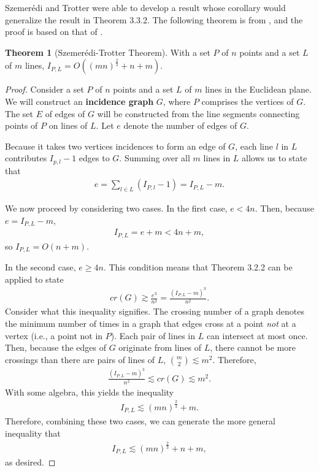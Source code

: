 \documentclass{scrippsthesisclass}
\theoremstyle{definition}
\newtheorem{theorem}{Theorem}[section]
\begin{document}
Szemer\'{e}di and Trotter were able to develop a result whose corollary would generalize the result in Theorem 3.3.2.
The following theorem is from \cite{SzemerediTrotter83}, and the proof is based on that of \cite{thebook}.
\begin{theorem}[Szemer\'{e}di-Trotter Theorem]
    With a set $P$ of $n$ points and a set $L$ of $m$ lines, $I_{P, L} = O((mn)^{\frac{2}{3}} + n + m)$.
\end{theorem}
\begin{proof}
    Consider a set $P$ of $n$ points and a set $L$ of $m$ lines in the Euclidean plane.
    We will construct an \textbf{incidence graph} $G$, where $P$ comprises the vertices of $G$. 
    The set $E$ of edges of $G$ will be constructed from the line segments connecting points of $P$ on lines of $L$.
    Let $e$ denote the number of edges of $G$. 
    
    Because it takes two vertices incidences to form an edge of $G$, each line $l$ in $L$ contributes $I_{p,l} - 1$ edges to $G$.
    Summing over all $m$ lines in $L$ allows us to state that 
    \begin{align}
        e = \sum_{l \in L} \left(I_{P, l} - 1\right) = I_{P, L} - m. 
    \end{align}
    
    We now proceed by considering two cases.
    In the first case, $e < 4n$.
    Then, because $e = I_{P, L} - m$,
    \begin{align}
        I_{P, L} = e + m < 4n + m,
    \end{align} 
    so $I_{P, L} = O(n + m)$. 

    In the second case, $e \geq 4n$.
    This condition means that Theorem 3.2.2 can be applied to state 
    \begin{align}
    cr(G) \gtrsim \frac{e^3}{n^2} = \frac{(I_{P,L} - m)^3}{n^2}. 
    \end{align}
    Consider what this inequality signifies. The crossing number of a graph denotes the minimum number of times in a graph that edges cross at a point \textit{not} at a vertex (i.e., a point not in $P$).
    Each pair of lines in $L$ can intersect at most once.
    Then, because the edges of $G$ originate from lines of $L$, there cannot be more crossings than there are pairs of lines of $L$, ${m \choose 2} \lesssim m^2$. 
    Therefore, 
    \begin{align}
        \frac{(I_{P,L}-m)^3}{n^2} \lesssim cr(G) \lesssim m^2.
    \end{align}
    With some algebra, this yields the inequality 
    \begin{align}
        I_{P, L} \lesssim (mn)^{\frac{2}{3}} + m.
    \end{align}
    Therefore, combining these two cases, we can generate the more general inequality that 
    \begin{align}
        I_{P, L} \lesssim (mn)^{\frac{2}{3}} + n + m,
    \end{align} as desired.
\end{proof}
\end{document}
